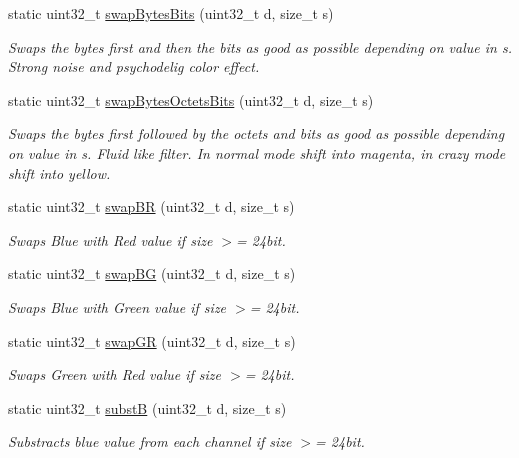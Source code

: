 \begin{DoxyCompactItemize}
static uint32\+\_\+t \mbox{\hyperlink{classSteganoMessage_a67f4f4c91ecddb89368c4b9cc42ac07e}{swap\+Bytes\+Bits}} (uint32\+\_\+t d, size\+\_\+t s)
\begin{DoxyCompactList}\small\item\em Swaps the bytes first and then the bits as good as possible depending on value in s. Strong noise and psychodelig color effect. \end{DoxyCompactList}\item 
static uint32\+\_\+t \mbox{\hyperlink{classSteganoMessage_ab17fa1a4dc587ae268e400913cc5f0c8}{swap\+Bytes\+Octets\+Bits}} (uint32\+\_\+t d, size\+\_\+t s)
\begin{DoxyCompactList}\small\item\em Swaps the bytes first followed by the octets and bits as good as possible depending on value in s. Fluid like filter. In normal mode shift into magenta, in crazy mode shift into yellow. \end{DoxyCompactList}\item 
static uint32\+\_\+t \mbox{\hyperlink{classSteganoMessage_a530e5ee67cf45ac56f8f3be4d2b44d2e}{swap\+BR}} (uint32\+\_\+t d, size\+\_\+t s)
\begin{DoxyCompactList}\small\item\em Swaps Blue with Red value if size $>$= 24bit. \end{DoxyCompactList}\item 
static uint32\+\_\+t \mbox{\hyperlink{classSteganoMessage_a06f64f5198cf180771dfe692125936be}{swap\+BG}} (uint32\+\_\+t d, size\+\_\+t s)
\begin{DoxyCompactList}\small\item\em Swaps Blue with Green value if size $>$= 24bit. \end{DoxyCompactList}\item 
static uint32\+\_\+t \mbox{\hyperlink{classSteganoMessage_a7e29a46073f2ef9c6e44bb1d46ad534f}{swap\+GR}} (uint32\+\_\+t d, size\+\_\+t s)
\begin{DoxyCompactList}\small\item\em Swaps Green with Red value if size $>$= 24bit. \end{DoxyCompactList}\item 
static uint32\+\_\+t \mbox{\hyperlink{classSteganoMessage_a7eb6fd157c777b2947603d018610ad0f}{substB}} (uint32\+\_\+t d, size\+\_\+t s)
\begin{DoxyCompactList}\small\item\em Substracts blue value from each channel if size $>$= 24bit. \end{DoxyCompactList}\item 

\end{DoxyCompactItemize}
